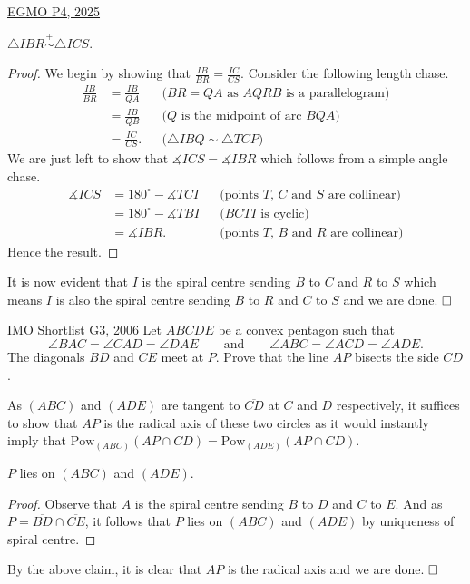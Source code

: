 \begin{problem}{7}{\href{https://artofproblemsolving.com/community/q2h3548106p35507758}{EGMO P4, 2025}}
\begin{solution}
	\begin{numclaim}
		$\triangle IBR\overset{+}{\sim}\triangle ICS$.
	\end{numclaim}
	\begin{proof} We begin by showing that $\frac{IB}{BR}=\frac{IC}{CS}$. Consider the following length chase.
\begin{align*} \frac{IB}{BR}&=\frac{IB}{QA} && \text{($BR=QA$ as $AQRB$ is a parallelogram)}\\ &=\frac{IB}{QB} && \text{($Q$ is the midpoint of arc $BQA$)}\\ &=\frac{IC}{CS}.&& \text{($\triangle IBQ\sim \triangle TCP$)} \end{align*}We are just left to show that $\measuredangle ICS=\measuredangle IBR$ which follows from a simple angle chase.
\begin{align*} \measuredangle ICS&=180^{\circ}-\measuredangle TCI &&\text{(points $T$, $C$ and $S$ are collinear)}\\ &=180^{\circ}-\measuredangle TBI && \text{($BCTI$ is cyclic)}\\ &=\measuredangle IBR. && \text{(points $T$, $B$ and $R$ are collinear)} \end{align*}Hence the result.
	\end{proof}

	It is now evident that $I$ is the spiral centre sending $B$ to $C$ and $R$ to $S$ which means $I$ is also the spiral centre sending $B$ to $R$ and $C$ to $S$ and we are done. $\qedwhite$
	\end{solution}
\end{problem}

\begin{problem}{8}{\href{https://artofproblemsolving.com/community/q2h130813p35493023}{IMO Shortlist G3, 2006}} 
	Let $ ABCDE$ be a convex pentagon such that
\[ \angle BAC = \angle CAD = \angle DAE\qquad \text{and}\qquad \angle ABC = \angle ACD = \angle ADE. \]The diagonals $BD$ and $CE$ meet at $P$. Prove that the line $AP$ bisects the side $CD$.
	\begin{solution} As $(ABC)$ and $(ADE)$ are tangent to $\overline{CD}$ at $C$ and $D$ respectively, it suffices to show that $AP$ is the radical axis of these two circles as it would instantly imply that $\text{Pow}_{(ABC)}(AP\cap CD)=\text{Pow}_{(ADE)}(AP\cap CD)$.

	\begin{numclaim}{1} $P$ lies on $(ABC)$ and $(ADE)$.
	\end{numclaim}
	\begin{proof} Observe that $A$ is the spiral centre sending $B$ to $D$ and $C$ to $E$. And as $P=\overline{BD}\cap \overline{CE}$, it follows that $P$ lies on $(ABC)$ and $(ADE)$ by uniqueness of spiral centre.
	\end{proof}

	By the above claim, it is clear that $AP$ is the radical axis and we are done. $\qedwhite$
	\end{solution}
\end{problem}

